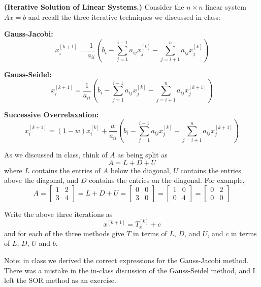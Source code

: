 \textbf{(Iterative Solution of Linear Systems.)} Consider the $n \times n$
linear system $Ax=b$ and recall the three iterative techniques we
discussed in class:

\textbf{Gauss-Jacobi:}
\[
x_i^{[k+1]} = \frac{1}{a_{ii}} \left( b_i - \sum_{j=1}^{i-1} a_{ij}
x_j^{[k]} - \sum_{j=i+1}^n a_{ij} x_j^{[k]} \right)
\]

\textbf{Gauss-Seidel:}
\[
x_i^{[k+1]} = \frac{1}{a_{ii}} \left(
b_i - \sum_{j=1}^{i-1} a_{ij} x_j^{[k]} - \sum_{j=i+1}^n a_{ij} x_j^{[k+1]}
\right)
\]

\textbf{Successive Overrelaxation:}
\[
x_i^{[k+1]} =
(1 - w)x_i^{[k]} + \frac{w}{a_{ii}}
\left(
b_i - \sum_{j=1}^{i-1} a_{ij} x_j^{[k]} - \sum_{j=i+1}^n a_{ij} x_j^{[k+1]}
\right)
\]

As we discussed in class, think of $A$ as being split as
\[
A = L + D + U
\]
where $L$ contains the entries of $A$ below the diagonal, $U$ contains
the entries above the diagonal, and $D$ contains the entries on the
diagonal. For example,
\[
A
= \left[\begin{matrix} 1 & 2 \\ 3 & 4 \end{matrix} \right]
= L + D + U
= \left[\begin{matrix} 0 & 0 \\ 3 & 0 \end{matrix} \right]
= \left[\begin{matrix} 1 & 0 \\ 0 & 4 \end{matrix} \right]
= \left[\begin{matrix} 0 & 2 \\ 0 & 0 \end{matrix} \right]
\]

Write the above three iterations as
\[
x^{[k+1]} = T_x^{[k]} + c
\]
and for each of the three methods give $T$ in terms of $L$, $D$, and
$U$, and $c$ in terms of $L$, $D$, $U$ and $b$.

Note: in class we derived the correct expressions for the Gauss-Jacobi
method. There was a mistake in the in-class discussion of the
Gauss-Seidel method, and I left the SOR method as an exercise.

